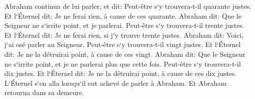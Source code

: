 \verse Abraham continua de lui parler, et dit: Peut-être s`y trouvera-t-il quarante justes. Et l`Éternel dit: Je ne ferai rien, à cause de ces quarante. 
\verse Abraham dit: Que le Seigneur ne s`irrite point, et je parlerai. Peut-être s`y trouvera-t-il trente justes. Et l`Éternel dit: Je ne ferai rien, si j`y trouve trente justes. 
\verse Abraham dit: Voici, j`ai osé parler au Seigneur. Peut-être s`y trouvera-t-il vingt justes. Et l`Éternel dit: Je ne la détruirai point, à cause de ces vingt. 
\verse Abraham dit: Que le Seigneur ne s`irrite point, et je ne parlerai plus que cette fois. Peut-être s`y trouvera-t-il dix justes. Et l`Éternel dit: Je ne la détruirai point, à cause de ces dix justes. 
\verse L`Éternel s`en alla lorsqu`il eut achevé de parler à Abraham. Et Abraham retourna dans sa demeure. 

